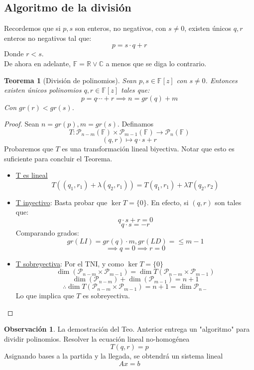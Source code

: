 \documentclass[11pt]{book}
\newtheorem{thm}{Teorema}[section]
\theoremstyle{definition}
\newtheorem{obs}{Observación}[section]
\begin{document}
\subsection{Algoritmo de la división}
Recordemos que si $p,s$ son enteros, no negativos, con $s\neq 0$, existen únicos $q,r$ enteros no negativos tal que:
\[p=s\cdot q+r\]
Donde $r<s$.\\
De ahora en adelante, $\mathbb{F}=\mathbb{R}\vee\mathbb{C}$ a menos que se diga lo contrario.
\begin{thm}[División de polinomios]
	Sean $p,s\in\mathbb{F}[z]$ con $s\neq 0$. Entonces existen únicos polinomios $q,r\in\mathbb{F}[z]$ tales que:
	\[p=q\cdots+r\implies n=gr(q)+m\]
	Con $gr(r)<gr(s)$.
\end{thm}
\begin{proof}
	Sean $n=gr(p), m=gr(s)$. Definamos
	\[T:\mathcal{P}_{n-m}(\mathbb{F})\times\mathcal{P}_{m-1}(\mathbb{F})\rightarrow\mathcal{P}_{n}(\mathbb{F})\]
	\[(q,r)\mapsto q\cdot s+r\]
	Probaremos que $T$ es una transformación lineal biyectiva. Notar que esto es suficiente para concluir el Teorema.
	\begin{itemize}
		\item \underline{T es lineal}
		      \[T((q_1,r_1)+\lambda (q_2,r_1))=T(q_1,r_1)+\lambda T(q_2,r_2)\]

		\item \underline{T inyectivo}: Basta probar que $\ker T=\{0\}$. En efecto, si $(q,r)$ son tales que:
		      \[q\cdot s+r=0\]
		      \[q\cdot s=-r\]
		      Comparando grados:
		      \[gr(LI)=gr(q)\cdot m,gr(LD)=\leq m-1\]
		      \[\implies q=0\implies r=0\]

		\item \underline{T sobreyectiva}: Por el TNI, y como $\ker T=\{0\}$
		      \[\dim(\mathcal{P}_{n-m}\times\mathcal{P}_{m-1})=\dim T(\mathcal{P}_{n-m}\times\mathcal{P}_{m-1})\]
		      \[\dim(\mathcal{P}_{n-m})+\dim(\mathcal{P}_{m-1})=n+1\]
		      \[\therefore \dim T(\mathcal{P}_{n-m}\times\mathcal{P}_{m-1})=n+1=\dim\mathcal{P}_{n-}\]
		      Lo que implica que $T$ es sobreyectiva.
	\end{itemize}
\end{proof}
\begin{obs}
	La demostración del Teo. Anterior entrega un "algoritmo" para dividir polinomios. Resolver la ecuación lineal no-homogénea
	\[T(q,r)=p\]
	Asignando bases a la partida y la llegada, se obtendrá un sistema lineal
	\[Ax=b\]
\end{obs}
\end{document}
